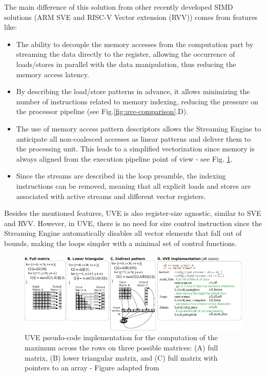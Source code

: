 The main difference of this solution from other recently developed SIMD solutions (ARM SVE and RISC-V Vector extension (RVV)) comes from features like:
\begin{itemize}
\item[]   The ability to decouple the memory accesses from the computation part by streaming the data directly to the register, allowing the occurrence of loads/stores in parallel with the data manipulation, thus reducing the memory access latency.


\item[]   By describing the load/store patterns in advance, it allows minimizing the number of instructions related to memory indexing, reducing the pressure on the processor pipeline (see Fig.\ref{fig:uve-comparison}.D). 



\item[]   The use of memory access pattern descriptors allows the Streaming Engine to anticipate all non-coalesced accesses as linear patterns and deliver them to the processing unit. This leads to a simplified vectorization since memory is always aligned from the execution pipeline point of view - see Fig. \ref{fig:uve-mem-access}. 


\item[]   Since the streams are described in the loop preamble, the indexing instructions can be removed, meaning that all explicit loads and stores are associated with active streams and different vector registers.
\end{itemize}

Besides the mentioned features, UVE is also register-size agnostic, similar to SVE and RVV. However, in UVE, there is no need for size control instruction since the Streaming Engine automatically disables all vector elements that fall out of bounds, making the loops simpler with a minimal set of control functions.


\begin{figure}[H]
	\begin{center}
 		\includegraphics[width=\linewidth]{images/UVE-pseudo-code.pdf}
 		\caption{UVE pseudo-code implementation for the computation of the maximum
across the rows on three possible matrices: (A) full matrix, (B) lower triangular
matrix, and (C) full matrix with pointers to an array - Figure adapted from \cite{uve-paper}}
 		\label{fig:uve-mem-access}
	\end{center} 
\end{figure}


